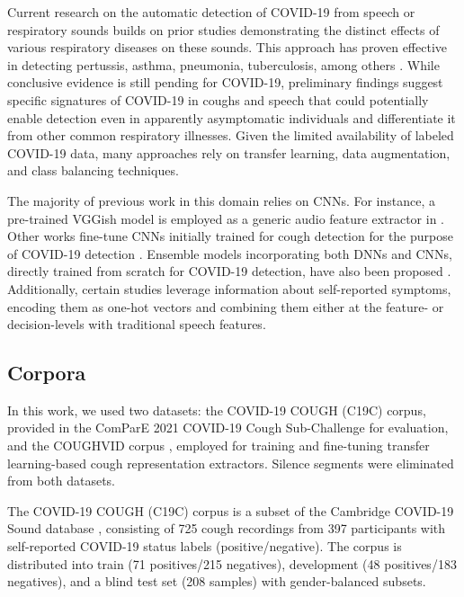 Current research on the automatic detection of COVID-19 from speech or respiratory sounds builds on prior studies demonstrating the distinct effects of various respiratory diseases on these sounds. This approach has proven effective in detecting pertussis, asthma, pneumonia, tuberculosis, among others \cite{pramono2016cough}. While conclusive evidence is still pending for COVID-19, preliminary findings suggest specific signatures of COVID-19 in coughs and speech that could potentially enable detection even in apparently asymptomatic individuals and differentiate it from other common respiratory illnesses. Given the limited availability of labeled COVID-19 data, many approaches rely on transfer learning, data augmentation, and class balancing techniques.

The majority of previous work in this domain relies on \acp{CNN}. For instance, a pre-trained VGGish model \cite{Hershey2017}is employed as a generic audio feature extractor in \cite{Chloe2020}. Other works fine-tune \acp{CNN} initially trained for cough detection for the purpose of COVID-19 detection \cite{Bagad2020,Imran2020}. Ensemble models incorporating both \acp{DNN} and \acp{CNN}, directly trained from scratch for COVID-19 detection, have also been proposed \cite{Chaudhari2021}. Additionally, certain studies  \cite{Han2021} leverage information about self-reported symptoms, encoding them as one-hot vectors and combining them either at the feature- or decision-levels with traditional speech features.

\subsection{Corpora}
In this work, we used two datasets: the COVID-19 COUGH (C19C) corpus, provided in the ComParE 2021 COVID-19 Cough Sub-Challenge \cite{Chloe2020,Han2021} for evaluation, and the COUGHVID corpus \cite{Orlandic2020}, employed for training and fine-tuning transfer learning-based cough representation extractors. Silence segments were eliminated from both datasets.

The COVID-19 COUGH (C19C) corpus is a subset of the Cambridge COVID-19 Sound database \cite{Chloe2020,Han2021}, consisting of 725 cough recordings from 397 participants with self-reported COVID-19 status labels (positive/negative). The corpus is distributed into train (71 positives/215 negatives), development (48 positives/183 negatives), and a blind test set (208 samples) with gender-balanced subsets. 

